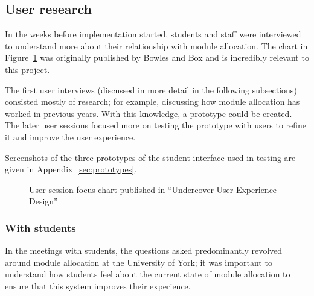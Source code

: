 
\subsection{User research}

In the weeks before implementation started, students and staff were
interviewed to understand more about their relationship with module
allocation. The chart in Figure~\ref{bowles_dualpurpose_chart} was originally
published by Bowles and Box and is incredibly relevant to this project.

The first user interviews (discussed in more detail in the following
subsections) consisted mostly of research; for example, discussing how module
allocation has worked in previous years. With this knowledge, a prototype
could be created. The later user sessions focused more on testing the
prototype with users to refine it and improve the user experience.

Screenshots of the three prototypes of the student interface used in testing
are given in Appendix~\ref{sec:prototypes}.

\begin{figure}
  \begin{center}
  \end{center}
  \caption{User session focus chart published in ``Undercover User Experience Design'' \cite{bowles2011undercover}}
  \label{bowles_dualpurpose_chart}
\end{figure}

\subsubsection{With students}

In the meetings with students, the questions asked predominantly revolved
around module allocation at the University of York; it was important to
understand how students feel about the current state of module allocation to
ensure that this system improves their experience.

